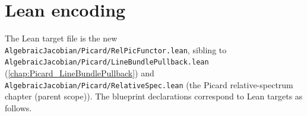 
\section{Lean encoding}
\label{sec:relpic_lean_encoding}

The Lean target file is the new
\texttt{AlgebraicJacobian/Picard/RelPicFunctor.lean}, sibling to
\texttt{AlgebraicJacobian/Picard/LineBundlePullback.lean}
(\cref{chap:Picard_LineBundlePullback}) and
\texttt{AlgebraicJacobian/Picard/RelativeSpec.lean}
(the Picard relative-spectrum chapter (parent scope)). The blueprint declarations correspond to
Lean targets as follows.

